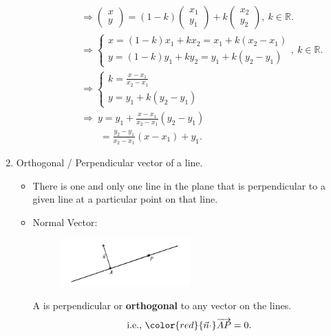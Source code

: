 \documentclass[12pt, a4paper]{article}
\begin{document}
\begin{enumerate}
\begin{itemize}
\begin{enumerate}
$$\begin{aligned}
        &\Rightarrow \begin{pmatrix}x\\y\end{pmatrix}=\left(1-k\right)\begin{pmatrix}x_1\\y_1\end{pmatrix}+k\begin{pmatrix}x_2\\y_2\end{pmatrix},\ k\in\mathbb{R}.\\
        &\Rightarrow \begin{cases}x=(1-k)x_1+kx_2=x_1+k(x_2-x_1)\\y=(1-k)y_1+ky_2=y_1+k(y_2-y_1)\end{cases},\ k\in\mathbb{R}.\\
        &\Rightarrow \begin{cases}k=\frac{x-x_1}{x_2-x_1}\\y=y_1+k(y_2-y_1)\end{cases}\\
        &\Rightarrow\ y=y_1+\frac{x-x_1}{x_2-x_1}(y_2-y_1)\\
        &\ \ \ \ \ \ \ \ \ =\frac{y_2-y_1}{x_2-x_1}(x-x_1)+y_1.
      \end{aligned}$$
    \end{enumerate}
  \end{itemize}
  \item Orthogonal / Perpendicular vector of a line. 
  \begin{itemize}
    \item There is one and only one line in the plane that is perpendicular to a given line at a particular point on that line. 
    \item Normal Vector: 
    \begin{myclaim}{ }{}
      \begin{figure}[H]
        \centering
        \includegraphics[width=0.5\textwidth]{Fig.3.9.jpg}
      \end{figure}
      A \textbf{\color{red}{normal vector}} is perpendicular or \textbf{orthogonal} to any vector on the lines. 
      $$\text{i.e., }{\color{red}{\vec{n}\cdot}\overrightarrow{AP}=0}.$$
    \end{myclaim}

\end{itemize}
\end{enumerate}
\end{document}
